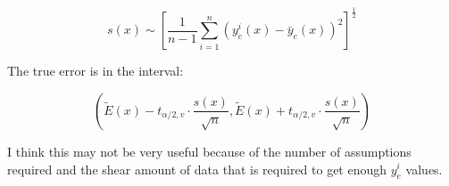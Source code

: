 \documentclass{article}
\begin{document}
\begin{equation}
  s(x) \sim \left [ \frac{1}{n-1} \sum^n_{i=1}\left ( y^i_e(x) - \bar{y}_e(x) \right ) ^2 \right ] ^\frac{1}{2}
\end{equation}

The true error is in the interval:

\begin{equation}
  \left ( \tilde{E}(x)-t_{\alpha/2,v}\cdot\frac{s(x)}{\sqrt{n}},\tilde{E}(x)+t_{\alpha/2,v}\cdot\frac{s(x)}{\sqrt{n}}  \right )
\end{equation}

I think this may not be very useful because of the number of
assumptions required and the shear amount of data that is required to
get enough $y^i_e$ values.
\end{document}
